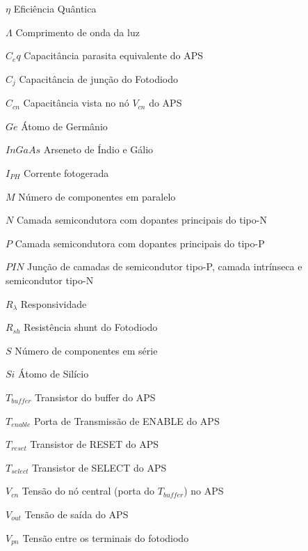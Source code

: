 \begin{simbolos}
  \item[$ \eta $] Eficiência Quântica
  \item[$ \Lambda $] Comprimento de onda da luz
  \item[$ C_eq$ ] Capacitância parasita equivalente do APS
  \item[$ C_j $] Capacitância de junção do Fotodiodo
  \item[$ C_{cn}$] Capacitância vista no nó $V_{cn}$ do APS
  \item[$ Ge $] Átomo de Germânio
  \item[$ InGaAs $] Arseneto de Índio e Gálio
  \item[$ I_{PH} $] Corrente fotogerada
  \item[$ M $] Número de componentes em paralelo
  \item[$ N $] Camada semicondutora com dopantes principais do tipo-N
  \item[$ P $] Camada semicondutora com dopantes principais do tipo-P
  \item[$ PIN $] Junção de camadas de semicondutor tipo-P, camada intrínseca e semicondutor tipo-N
  \item[$ R_\lambda $] Responsividade
  \item[$ R_{sh} $] Resistência shunt do Fotodiodo
  \item[$ S $] Número de componentes em série
  \item[$ Si $] Átomo de Silício
  \item[$ T_{buffer} $] Transistor do buffer do APS
  \item[$ T_{enable} $] Porta de Transmissão de ENABLE do APS
  \item[$ T_{reset} $] Transistor de RESET do APS
  \item[$ T_{select} $] Transistor de SELECT do APS
  
  
  \item[$ V_{cn} $] Tensão do nó central (porta do $T_{buffer}$) no APS
  \item[$ V_{out} $] Tensão de saída do APS
  \item[$V_{pn}$] Tensão entre os terminais do fotodiodo
  
\end{simbolos}
